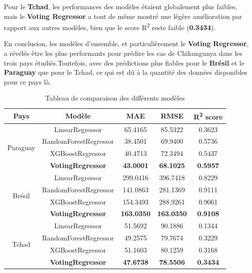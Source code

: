 Pour le \textbf{Tchad}, les performances des modèles étaient globalement plus faibles, mais le \textbf{Voting Regressor} a tout de même montré une légère amélioration par rapport aux autres modèles, bien que le score R\textsuperscript{2} reste faible (\textbf{0.3434}).

En conclusion, les modèles d'ensemble, et particulièrement le \textbf{Voting Regressor}, a révélés être les plus performants pour prédire les cas de Chikungunya dans les trois pays étudiés.Toutefois, avec des prédictions plus fiables pour le \textbf{Brésil} et le \textbf{Paraguay} que pour le Tchad, ce qui est dû à la quantité des données disponibles pour ce pays là.

\begin{table}[!hbt]
	\centering
	\caption{Tableau de comparaison des différents modèles}
	\label{tab:performance}
	\begin{tabular}{|c|c|c|c|c|}	
		
		\hline
		Pays & Modèle & MAE & RMSE & R\textsuperscript{2} score \\
		\hline
		\multirow{4}{*}{Paraguay} & LinearRegressor & 65.4165 & 85.5322 & 0.3623 \\
		\cline{2-5}
		& RandomForestRegressor & 38.4501 & 69.9400 & 0.5736 \\
		\cline{2-5}
		& XGBoostRegressor & 40.4713 & 72.3494 & 0.5437 \\
		\cline{2-5}
		& \textbf{VotingRegressor} & \textbf{43.0001} & \textbf{68.1025} & \textbf{0.5957} \\
		\hline
		\multirow{4}{*}{Brésil} & LinearRegressor & 299.0416 & 396.7418 & 0.8229 \\
		\cline{2-5}
		& RandomForestRegressor & 141.0863 & 281.1369 & 0.9111 \\
		\cline{2-5}
		& XGBoostRegressor & 154.3493 & 288.9261 & 0.9061\\
		\cline{2-5}
		& \textbf{VotingRegressor} & \textbf{163.0350}  & \textbf{163.0350} & \textbf{0.9108} \\
		\hline
		\multirow{4}{*}{Tchad} & LinearRegressor & 51.5692 & 90.1886 & 0.1344 \\
		\cline{2-5}
		& RandomForestRegressor & 49.2575 & 79.7674 & 0.3229 \\
		\cline{2-5}
		& XGBoostRegressor & 51.1603 & 80.1259 & 0.3168 \\
		\cline{2-5}
		& \textbf{VotingRegressor} & \textbf{47.6738} & \textbf{78.5506} & \textbf{0.3434} \\
		\hline
	\end{tabular}
\end{table}

